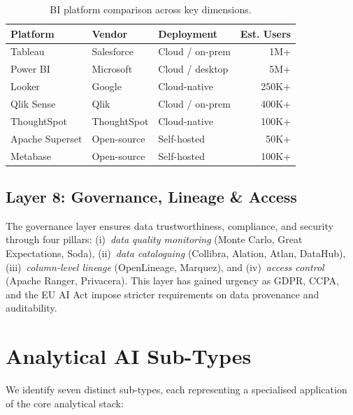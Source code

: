 \documentclass[12pt, a4paper]{article}
\begin{document}
\begin{table}[ht]
\centering
\caption{BI platform comparison across key dimensions.}
\label{tab:bi-platforms}
\begin{tabular}{lllr}
\toprule
\textbf{Platform} & \textbf{Vendor} & \textbf{Deployment} & \textbf{Est. Users} \\
\midrule
Tableau         & Salesforce  & Cloud / on-prem  & 1M+ \\
Power BI        & Microsoft   & Cloud / desktop  & 5M+ \\
Looker          & Google      & Cloud-native     & 250K+ \\
Qlik Sense      & Qlik        & Cloud / on-prem  & 400K+ \\
ThoughtSpot     & ThoughtSpot & Cloud-native     & 100K+ \\
Apache Superset & Open-source & Self-hosted      & 50K+ \\
Metabase        & Open-source & Self-hosted      & 100K+ \\
\bottomrule
\end{tabular}
\end{table}

\subsection{Layer 8: Governance, Lineage \& Access}
The governance layer ensures data trustworthiness, compliance, and security through four pillars: (i)~\emph{data quality monitoring} (Monte Carlo, Great Expectations, Soda), (ii)~\emph{data cataloguing} (Collibra, Alation, Atlan, DataHub), (iii)~\emph{column-level lineage} (OpenLineage, Marquez), and (iv)~\emph{access control} (Apache Ranger, Privacera). This layer has gained urgency as GDPR, CCPA, and the EU AI Act impose stricter requirements on data provenance and auditability.

\section{Analytical AI Sub-Types}\label{sec:subtypes}

We identify seven distinct sub-types, each representing a specialised application of the core analytical stack:
\end{document}
